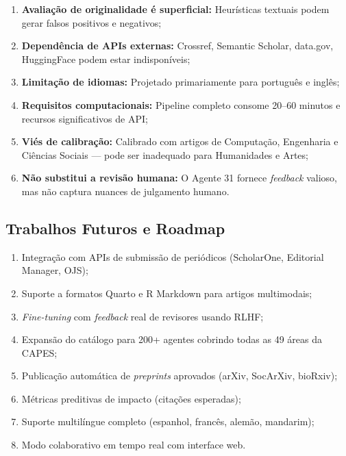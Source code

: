 \begin{enumerate}
    \item \textbf{Avaliação de originalidade é superficial:}
    Heurísticas textuais podem gerar falsos positivos e negativos;

    \item \textbf{Dependência de APIs externas:} Crossref, Semantic
    Scholar, data.gov, HuggingFace podem estar indisponíveis;

    \item \textbf{Limitação de idiomas:} Projetado primariamente
    para português e inglês;

    \item \textbf{Requisitos computacionais:} Pipeline completo
    consome 20--60 minutos e recursos significativos de API;

    \item \textbf{Viés de calibração:} Calibrado com artigos de
    Computação, Engenharia e Ciências Sociais — pode ser inadequado
    para Humanidades e Artes;

    \item \textbf{Não substitui a revisão humana:} O Agente 31
    fornece \textit{feedback} valioso, mas não captura nuances de
    julgamento humano.
\end{enumerate}

\subsection{Trabalhos Futuros e Roadmap}
\label{sec:roadmap_futuro}

\begin{enumerate}
    \item Integração com APIs de submissão de periódicos
    (ScholarOne, Editorial Manager, OJS);

    \item Suporte a formatos Quarto e R Markdown para artigos
    multimodais;

    \item \textit{Fine-tuning} com \textit{feedback} real de
    revisores usando RLHF;

    \item Expansão do catálogo para 200+ agentes cobrindo todas as
    49 áreas da CAPES;

    \item Publicação automática de \textit{preprints} aprovados
    (arXiv, SocArXiv, bioRxiv);

    \item Métricas preditivas de impacto (citações esperadas);

    \item Suporte multilíngue completo (espanhol, francês, alemão,
    mandarim);

    \item Modo colaborativo em tempo real com interface web.
\end{enumerate}

